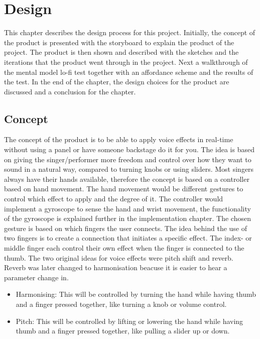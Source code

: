 \chapter{Design}

This chapter describes the design process for this project. Initially, the concept of the product is presented with the storyboard to explain the product of the project. The product is then shown and described with the sketches and the iterations that the product went through in the project. Next a walkthrough of the mental model lo-fi test together with an affordance scheme and the results of the test. In the end of the chapter, the design choices for the product are discussed and a conclusion for the chapter.

\section{Concept}
The concept of the product is to be able to apply voice effects in real-time without using a panel or have someone backstage do it for you. The idea is based on giving the singer/performer more freedom and control over how they want to sound in a natural way, compared to turning knobs or using sliders. Most singers always have their hands available, therefore the concept is based on a controller based on hand movement. The hand movement would be different gestures to control which effect to apply and the degree of it.
The controller would implement a gyroscope to sense the hand and wrist movement, the functionality of the gyroscope is explained further in the implementation chapter. 
The chosen gesture is based on which fingers the user connects. The idea behind the use of two fingers is to create a connection that initiates a specific effect. 
The index- or middle finger each control their own effect when the finger is connected to the thumb.
The two original ideas for voice effects were pitch shift and reverb. Reverb was later changed to harmonisation beacuse it is easier to hear a parameter change in. 


\begin{itemize}
\item Harmonising: This will be controlled by turning the hand while having thumb and a finger pressed together, like turning a knob or volume control.
\item Pitch: This will be controlled by lifting or lowering the hand while having thumb and a finger pressed together, like pulling a slider up or down.
\end{itemize}

